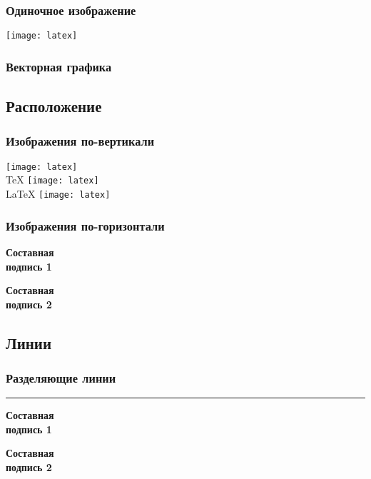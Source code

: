 \begin{frame}
    \frametitle{Одиночное изображение}
    \centering
    \texttt{[image: latex]} %
\end{frame}

\begin{frame}
    \frametitle{Векторная графика}
    \centering
   

\end{frame}

\subsection{Расположение}

\begin{frame}
    \frametitle{Изображения по-вертикали}
    \centering
    \vfill
    \texttt{[image: latex]} \\
    \TeX
    \vfill
    \texttt{[image: latex]} \\
    \LaTeX
    \vfill
    \texttt{[image: latex]} \\
    \vfill
\end{frame}


\begin{frame}
    \frametitle{Изображения по-горизонтали}
    \begin{minipage}[t]{0.47\linewidth}
        \textbf{Составная \\ подпись 1}
    \end{minipage}
    \hfill
    \begin{minipage}[t]{0.47\linewidth}
        \textbf{Составная \\ подпись 2}
    \end{minipage}
\end{frame}

\subsection{Линии}

\begin{frame}
    \frametitle{Разделяющие линии}
    \begin{minipage}[c]{0.47\linewidth}
        \bigskip
        \hrule{}
        \bigskip
        \textbf{Составная \\ подпись 1}
    \end{minipage}
    \hfill
    \vrule{}
    \hfill
    \begin{minipage}[c]{0.47\linewidth}
        \flushright
        \textbf{Составная \\ подпись 2}
    \end{minipage}
\end{frame}

